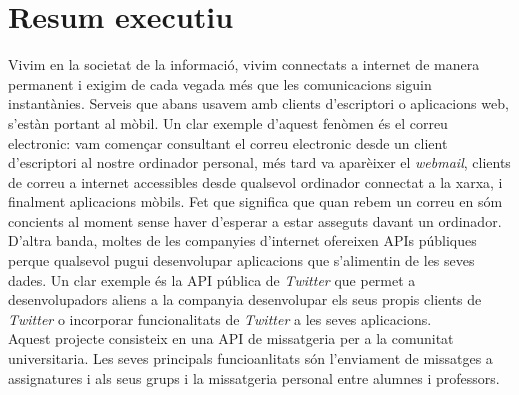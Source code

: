 
\chapter{Resum executiu}

Vivim en la societat de la informació, vivim connectats a internet de manera permanent i exigim de cada vegada més que les comunicacions siguin instantànies. Serveis que abans usavem amb clients d'escriptori o aplicacions web, s'estàn portant al mòbil. Un clar exemple d'aquest fenòmen és el correu electronic: vam començar consultant el correu electronic desde un client d'escriptori al nostre ordinador personal, més tard va aparèixer el \emph{webmail}, clients de correu a internet accessibles desde qualsevol ordinador connectat a la xarxa, i finalment aplicacions mòbils. Fet que significa que quan rebem un correu en sóm concients al moment sense haver d'esperar a estar asseguts davant un ordinador.\\

D'altra banda, moltes de les companyies d'internet ofereixen APIs públiques perque qualsevol pugui desenvolupar aplicacions que s'alimentin de les seves dades. Un clar exemple és la API pública de \emph{Twitter} que permet a desenvolupadors aliens a la companyia desenvolupar els seus propis clients de \emph{Twitter }o incorporar funcionalitats de \emph{Twitter} a les seves aplicacions. \\

Aquest projecte consisteix en una API de missatgeria per a la comunitat universitaria. Les seves principals funcioanlitats són l'enviament de missatges a assignatures i als seus grups i la missatgeria personal entre alumnes i professors.\\